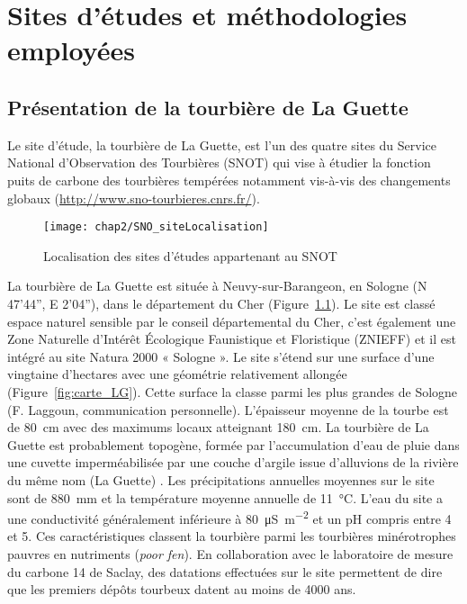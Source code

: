 \singlespacing
\chapter{Sites d'études et méthodologies employées}
\label{ch:ch2}

\minitoc

\newpage
\doublespacing
\section{Présentation de la tourbière de La Guette}

Le site d'étude, la tourbière de La Guette, est l'un des quatre sites du Service National d'Observation des Tourbières (SNOT) qui vise à étudier la fonction puits de carbone des tourbières tempérées notamment vis-à-vis des changements globaux (\url{http://www.sno-tourbieres.cnrs.fr/}).

\begin{figure}[h]
\centering
\texttt{[image: chap2/SNO\_siteLocalisation]}
\caption{Localisation des sites d'études appartenant au SNOT}
\label{fig:carte_europe}
\end{figure}

La tourbière de La Guette est située à Neuvy-sur-Barangeon, en Sologne (N 47’44”, E 2’04”), dans le département du Cher (Figure~\ref{fig:carte_europe}).
Le site est classé espace naturel sensible par le conseil départemental du Cher, c'est également une Zone Naturelle d'Intérêt Écologique Faunistique et Floristique (ZNIEFF) et il est intégré au site Natura 2000 « Sologne ».
Le site s'étend sur une surface d'une vingtaine d'hectares avec une géométrie relativement allongée (Figure~\ref{fig:carte_LG}).
Cette surface la classe parmi les plus grandes de Sologne (F. Laggoun, communication personnelle).
L'épaisseur moyenne de la tourbe est de \SI{80}{\centi\metre} avec des maximums locaux atteignant \SI{180}{\centi\metre}.
La tourbière de La Guette est probablement topogène, formée par l'accumulation d'eau de pluie dans une cuvette imperméabilisée par une couche d'argile issue d'alluvions de la rivière du même nom (La Guette) \plop.
Les précipitations annuelles moyennes sur le site sont de \SI{880}{\milli\metre} et la température moyenne annuelle de \SI{11}{\degreeCelsius}.
L'eau du site a une conductivité généralement inférieure à \SI{80}{\micro\siemens\per\square\metre} et un pH compris entre 4 et 5.
Ces caractéristiques classent la tourbière parmi les tourbières minérotrophes pauvres en nutriments (\textit{poor fen}).
En collaboration avec le laboratoire de mesure du carbone 14 de Saclay, des datations effectuées sur le site permettent de dire que les premiers dépôts tourbeux datent au moins de \num{4000} ans.

